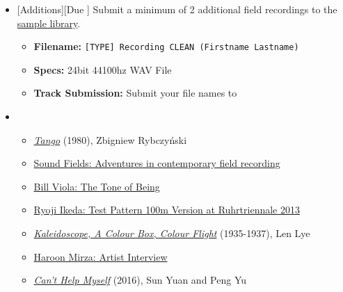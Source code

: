 \begin{itemize}[noitemsep,topsep=0pt,leftmargin=*]
	\item {}[Additions][Due \dSun] \newline
	      Submit a minimum of 2 additional field recordings to the \href{\samplelibPermURL}{sample library}.
	      \begin{itemize}
		      \item \textbf{Filename:} \texttt{[TYPE] Recording CLEAN (Firstname Lastname)}
		      \item \textbf{Specs:} 24bit 44100hz WAV File
		      \item \textbf{Track Submission:} Submit your file names to \discordS
	      \end{itemize}
	\item {}
	      \begin{itemize}
		      \item \href{https://www.youtube.com/watch?v=u0pEpA_Y1a4}{\emph{Tango}} (1980), Zbigniew Rybczyński
		      \item \href{https://www.youtube.com/watch?v=esfUwg1-xrI}{Sound Fields: Adventures in contemporary field recording}
		      \item \href{https://vimeo.com/64302190}{Bill Viola: The Tone of Being}
		      \item \href{https://www.youtube.com/watch?v=XwjlYpJCBgk}{Ryoji Ikeda: Test Pattern 100m Version at Ruhrtriennale 2013}
		      \item \href{https://www.youtube.com/watch?v=-DksmbDMDUU}{\emph{Kaleidoscope, A Colour Box, Colour Flight}} (1935-1937), Len Lye
		      \item \href{https://www.youtube.com/watch?v=Y8Zpr1ESEO4}{Haroon Mirza: Artist Interview}
		      \item \href{https://www.youtube.com/watch?v=ZS4Bpr2BgnE}{\emph{Can’t Help Myself}} (2016), Sun Yuan and Peng Yu
	      \end{itemize}
\end{itemize}